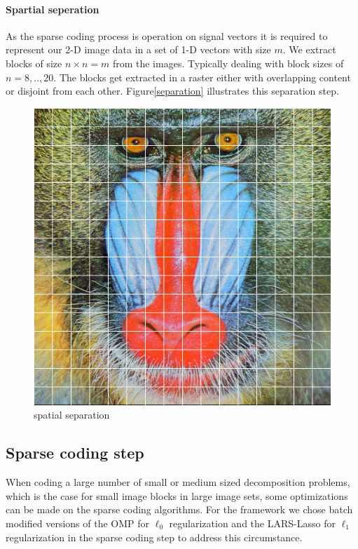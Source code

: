 \paragraph{Spartial seperation}
As the sparse coding process is operation on signal vectors it is required to
represent our 2-D image data in a set of 1-D vectors with size $m$. We extract
blocks of size $n \times n=m$ from the images. Typically dealing with block
sizes of $n=8,..,20$. The blocks get extracted in a raster either with
overlapping content or disjoint from each other. Figure\ref{separation}
illustrates this separation step.
\begin{figure}[h]
\centering
\includegraphics[scale = 0.25]{images/segmentation.png}
\caption{spatial separation}
\label{fig:separation}
\end{figure}

\subsection{Sparse coding step}
When coding a large number of small or medium sized decomposition problems,
which is the case for small image blocks in large image sets, some
optimizations can be made on the sparse coding algorithms. 
For the framework we chose batch modified versions of the OMP for $\ell_0$
regularization and the LARS-Lasso for $\ell_1$ regularization in the sparse
coding step to address this circumstance. 

